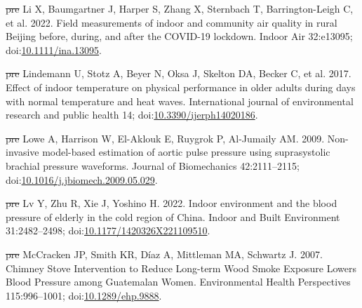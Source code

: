 \documentclass[
  letterpaper,
  DIV=11,
  numbers=noendperiod]{scrartcl}
\newlength{\cslhangindent}
\newenvironment{CSLReferences}[2] %
 {\begin{list}{}{%
  \setlength{\itemindent}{0pt} %
  \setlength{\leftmargin}{0pt} %
  \setlength{\parsep}{0pt} %
  \ifodd #1
   \setlength{\leftmargin}{\cslhangindent} %
   \setlength{\itemindent}{-1\cslhangindent} %
  \fi
  \setlength{\itemsep}{#2\baselineskip}}} %
 {\end{list}} %
\providecommand{\DIFdeltex}[1]{{\protect\color{red}\sout{#1}}}                      %
\providecommand{\DIFaddbegin}{} %
\providecommand{\DIFaddend}{} %
\providecommand{\DIFdelbegin}{} %
\providecommand{\DIFdelend}{} %
\providecommand{\DIFdel}[1]{\texorpdfstring{\DIFdeltex{#1}}{}} %
\newcommand{\DIFscaledelfig}{0.5}
\newlength{\DIFdelgraphicswidth} %
\newlength{\DIFdelgraphicsheight} %
\newcommand{\DIFaddincludegraphics}[2][]{{\color{blue}\fbox{\DIFOincludegraphics[#1]{#2}}}} %
\newcommand{\DIFdelincludegraphics}[2][]{%
\sbox{\DIFdelgraphicsbox}{\DIFOincludegraphics[#1]{#2}}%
\settoboxwidth{\DIFdelgraphicswidth}{\DIFdelgraphicsbox} %
\settoboxtotalheight{\DIFdelgraphicsheight}{\DIFdelgraphicsbox} %
\scalebox{\DIFscaledelfig}{%
\parbox[b]{\DIFdelgraphicswidth}{\usebox{\DIFdelgraphicsbox}\\[-\baselineskip] \rule{\DIFdelgraphicswidth}{0em}}\llap{\resizebox{\DIFdelgraphicswidth}{\DIFdelgraphicsheight}{%
\setlength{\unitlength}{\DIFdelgraphicswidth}%
\begin{picture}(1,1)%
\thicklines\linethickness{2pt} %
{\color[rgb]{1,0,0}\put(0,0){\framebox(1,1){}}}%
{\color[rgb]{1,0,0}\put(0,0){\line( 1,1){1}}}%
{\color[rgb]{1,0,0}\put(0,1){\line(1,-1){1}}}%
\end{picture}%
}\hspace*{3pt}}} %
} %
\DeclareRobustCommand{\DIFaddbegin}{\DIFOaddbegin \let\includegraphics\DIFaddincludegraphics} %
\DeclareRobustCommand{\DIFaddend}{\DIFOaddend \let\includegraphics\DIFOincludegraphics} %
\DeclareRobustCommand{\DIFdelbegin}{\DIFOdelbegin \let\includegraphics\DIFdelincludegraphics} %
\DeclareRobustCommand{\DIFdelend}{\DIFOaddend \let\includegraphics\DIFOincludegraphics} %
\begin{document}
\begin{CSLReferences}{1}{1}
\DIFdelbegin %
\DIFdel{pre}%
\DIFdelend \DIFaddbegin {}
\DIFaddend Li X, Baumgartner J, Harper S, Zhang X, Sternbach T, Barrington-Leigh C,
et al. 2022. Field measurements of indoor and community air quality in
rural {Beijing} before, during, and after the {COVID-19} lockdown.
Indoor Air 32:e13095;
doi:\href{https://doi.org/10.1111/ina.13095}{10.1111/ina.13095}.

\DIFdelbegin %
\DIFdel{pre}%
\DIFdelend \DIFaddbegin {}
\DIFaddend Lindemann U, Stotz A, Beyer N, Oksa J, Skelton DA, Becker C, et al.
2017. Effect of indoor temperature on physical performance in older
adults during days with normal temperature and heat waves. International
journal of environmental research and public health 14;
doi:\href{https://doi.org/10.3390/ijerph14020186}{10.3390/ijerph14020186}.

\DIFdelbegin %
\DIFdel{pre}%
\DIFdelend \DIFaddbegin {}
\DIFaddend Lowe A, Harrison W, El-Aklouk E, Ruygrok P, Al-Jumaily AM. 2009.
Non-invasive model-based estimation of aortic pulse pressure using
suprasystolic brachial pressure waveforms. Journal of Biomechanics
42:2111--2115;
doi:\href{https://doi.org/10.1016/j.jbiomech.2009.05.029}{10.1016/j.jbiomech.2009.05.029}.

\DIFdelbegin %
\DIFdel{pre}%
\DIFdelend \DIFaddbegin {}
\DIFaddend Lv Y, Zhu R, Xie J, Yoshino H. 2022. Indoor environment and the blood
pressure of elderly in the cold region of {China}. Indoor and Built
Environment 31:2482--2498;
doi:\href{https://doi.org/10.1177/1420326X221109510}{10.1177/1420326X221109510}.

\DIFdelbegin %
\DIFdel{pre}%
\DIFdelend \DIFaddbegin {}
\DIFaddend McCracken JP, Smith KR, Díaz A, Mittleman MA, Schwartz J. 2007. Chimney
{Stove Intervention} to {Reduce Long-term Wood Smoke Exposure Lowers
Blood Pressure} among {Guatemalan Women}. Environmental Health
Perspectives 115:996--1001;
doi:\href{https://doi.org/10.1289/ehp.9888}{10.1289/ehp.9888}.


\end{CSLReferences}
\end{document}
